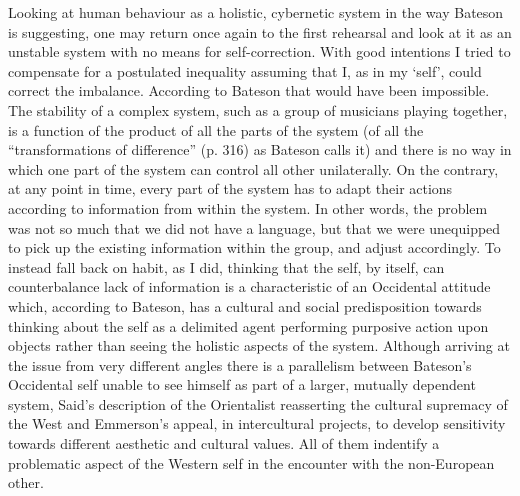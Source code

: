 \documentclass[a4paper]{article}
\begin{document}
Looking at human behaviour as a holistic, cybernetic system in the way Bateson is suggesting, one may return once again to the first rehearsal and look at it as an unstable system with no means for self-correction. With good intentions I tried to compensate for a postulated inequality assuming that I, as in my `self', could correct the imbalance. According to Bateson that would have been impossible. The stability of a complex system, such as a group of musicians playing together, is a function of the product of all the parts of the system (of all the ``transformations of difference'' (p. 316) as Bateson calls it) and there is no way in which one part of the system can control all other unilaterally. On the contrary, at any point in time, every part of the system has to adapt their actions according to information from within the system. In other words, the problem was not so much that we did not have a language, but that we were unequipped to pick up the existing information within the group, and adjust accordingly. To instead fall back on habit, as I did, thinking that the self, by itself, can counterbalance lack of information is a characteristic of an Occidental attitude which, according to Bateson, has a cultural and social predisposition towards thinking about the self as a delimited agent performing purposive action upon objects rather than seeing the holistic aspects of the system. Although arriving at the issue from very different angles there is a parallelism between Bateson's Occidental self unable to see himself as part of a larger, mutually dependent system, Said's description of the Orientalist reasserting the cultural supremacy of the West and Emmerson's appeal, in intercultural projects, to develop sensitivity towards different aesthetic and cultural values. All of them indentify a problematic aspect of the Western self in the encounter with the non-European other. 
\end{document}
